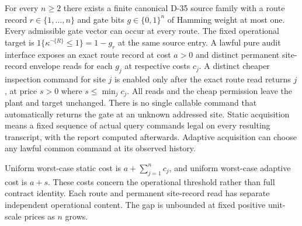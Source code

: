 \begin{theorem}\label{ext:m022}

For every \(n\ge2\) there exists a finite canonical D-35 source family with a route record \(r\in\{1,\dots,n\}\) and gate bits \(g\in\{0,1\}^n\) of Hamming weight at most one. Every admissible gate vector can occur at every route. The fixed operational target is \(1\{\kappa^{\neg\{R\}}\le1\}=1-g_r\) at the same source entry. A lawful pure audit interface exposes an exact route record at cost \(a>0\) and distinct permanent site-record envelope reads for each \(g_j\) at respective costs \(c_j\). A distinct cheaper inspection command for site \(j\) is enabled only after the exact route read returns \(j\), at price \(s>0\) where \(s\le \min_j c_j\). All reads and the cheap permission leave the plant and target unchanged. There is no single callable command that automatically returns the gate at an unknown addressed site. Static acquisition means a fixed sequence of actual query commands legal on every resulting transcript, with the report computed afterwards. Adaptive acquisition can choose any lawful common command at its observed history.

Uniform worst-case static cost is \(a+\sum_{j=1}^n c_j\), and uniform worst-case adaptive cost is \(a+s\). These costs concern the operational threshold rather than full contract identity. Each route and permanent site-record read has separate independent operational content. The gap is unbounded at fixed positive unit-scale prices as \(n\) grows.

\end{theorem}

